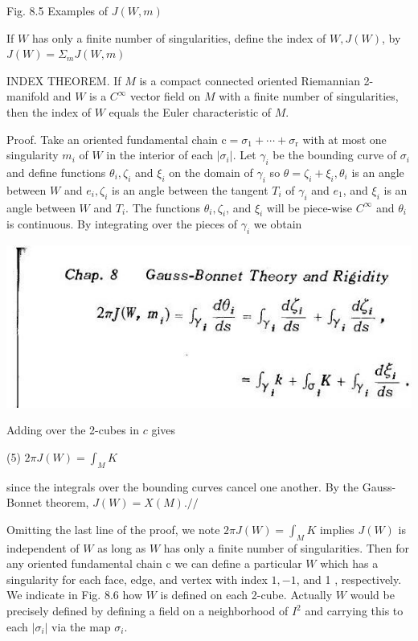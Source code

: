\documentclass[10pt]{article}
\begin{document}
Fig. 8.5 Examples of $J(W, m)$

If $W$ has only a finite number of singularities, define the index of $W, J(W)$, by $J(W)=\Sigma_{m} J(W, m)$

INDEX THEOREM. If $M$ is a compact connected oriented Riemannian 2-manifold and $W$ is a $C^{\infty}$ vector field on $M$ with a finite number of singularities, then the index of $W$ equals the Euler characteristic of $M$.

Proof. Take an oriented fundamental chain $\mathrm{c}=\sigma_{1}+\cdots+\sigma_{\mathrm{r}}$ with at most one singularity $m_{i}$ of $W$ in the interior of each $\left|\sigma_{i}\right|$. Let $\gamma_{i}$ be the bounding curve of $\sigma_{i}$ and define functions $\theta_{i}, \zeta_{i}$ and $\xi_{i}$ on the domain of $\gamma_{i}$ so $\theta=\zeta_{i}+\xi_{i}, \theta_{i}$ is an angle between $W$ and $e_{i}, \zeta_{i}$ is an angle between the tangent $T_{i}$ of $\gamma_{i}$ and $e_{1}$, and $\xi_{i}$ is an angle between $W$ and $T_{i}$. The functions $\theta_{i}, \zeta_{i}$, and $\xi_{i}$ will be piece-wise $C^{\infty}$ and $\theta_{i}$ is continuous. By integrating over the pieces of $\gamma_{i}$ we obtain

\includegraphics[max width=\textwidth]{2022_07_16_f4e476ee2159dc67e746g-60(1)}

Adding over the 2-cubes in $c$ gives

(5) $2 \pi J(W)=\int_{M} K$

since the integrals over the bounding curves cancel one another. By the Gauss-Bonnet theorem, $J(W)=X(M) . / /$

Omitting the last line of the proof, we note $2 \pi J(W)=\int_{M} K$ implies $J(W)$ is independent of $W$ as long as $W$ has only a finite number of singularities. Then for any oriented fundamental chain $\mathrm{c}$ we can define a particular $W$ which has a singularity for each face, edge, and vertex with index $1,-1$, and 1 , respectively. We indicate in Fig. $8.6$ how $W$ is defined on each 2-cube. Actually $W$ would be precisely defined by defining a field on a neighborhood of $I^{2}$ and carrying this to each $\left|\sigma_{i}\right|$ via the map $\sigma_{i}$.
\end{document}

